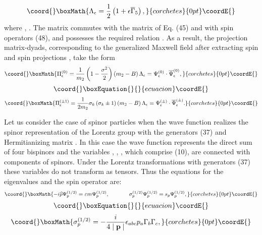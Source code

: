 \documentclass[a4paper,12pt]{article}
\begin{document}
\[\coord{}\boxMath{
\Lambda _\epsilon =\frac 12\left( 1+\epsilon \overline{\Gamma
}_5\right) ,
}{corchetes}{0pt}\coordE{}\]
where \coordHE{}, \coordHE{}.
The matrix \myHighlight{$ \Lambda _\epsilon $}\coordHE{} commutes with the matrix \coordHE{} of
Eq. (45) and with spin operators (48), and possesses the required
relation \coordHE{}. As a result,
the projection matrix-dyads, corresponding to the generalized
Maxwell field after extracting spin \coordHE{} and spin projections \coordHE{}, take the form
\[\coord{}\boxMath{
\Pi^{(0)}_\epsilon =\frac 1{m_2}\left( 1-\frac{\sigma ^2}2\right)
\left( m_2-B\right) \Lambda _\epsilon =\Psi ^{(0)}_\epsilon \cdot
\overline{\Psi }^{(0)}_\epsilon ,
}{corchetes}{0pt}\coordE{}\]
\vspace{-8mm}
\begin{equation}\coord{}\boxEquation{
\label{49}
}{
}{ecuacion}\coordE{}\end{equation}
\vspace{-8mm}
\[\coord{}\boxMath{
\Pi^{(\pm 1)}_\epsilon=\frac 1{2m_2}\sigma _k\left( \sigma _k\pm
1\right) \left( m_2-B\right)\Lambda _\epsilon  =\Psi ^{(\pm
)}_\epsilon \cdot \overline{\Psi }^{(\pm )}_\epsilon .
}{corchetes}{0pt}\coordE{}\]

Let us consider the case of spinor particles when the wave
function \coordHE{} realizes the spinor representation of the
Lorentz group with the generators (37) and Hermitianizing matrix
\coordHE{}. In this case the wave function \coordHE{} represents the direct sum of four bispinors and the variables
\coordHE{}, \myHighlight{$\psi _\mu $}\coordHE{}, \myHighlight{$\psi _{[\mu \nu ]},$}\coordHE{}  \myHighlight{$ \widetilde{\psi
}_\mu ,$}\coordHE{}  \coordHE{}, which comprise \coordHE{} (10),
are connected with components of spinors. Under the Lorentz
transformations with generators (37) these variables do not
transform as tensors. Thus the equations for the eigenvalues and
the spin operator are:
\[\coord{}\boxMath{
-i\widehat{p}\Psi _p^{(1/2)}=\varepsilon m\Psi _p^{(1/2)} ,
\hspace{0.5in} \sigma _p^{(1/2)}\Psi _p^{(1/2)}=s_p\Psi _p^{(1/2)}
,
}{corchetes}{0pt}\coordE{}\]
\vspace{-8mm}
\begin{equation}\coord{}\boxEquation{  \label{50}
}{  }{ecuacion}\coordE{}\end{equation}
\vspace{-8mm}
\[\coord{}\boxMath{
\sigma _p^{(1/2)}=-\frac i{4\mid \mathbf{p}\mid }\epsilon
_{abc}p_a\Gamma _b\Gamma _c ,
}{corchetes}{0pt}\coordE{}\]
\end{document}
